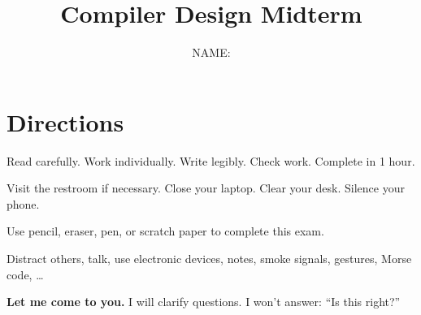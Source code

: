 \documentclass[addpoints]{exam}
\title{Compiler Design Midterm}
\author{NAME: \underline{\hspace{10cm}}}
\date{}
\begin{document}
\maketitle

\section*{Directions}
Read carefully. Work individually. Write legibly. Check work. Complete in 1 hour.
\begin{description}[leftmargin=!,labelwidth=\widthof{\bfseries Beforehand}]
\item[Beforehand] Visit the restroom if necessary. Close your laptop. Clear your desk. Silence your phone.
\item[DO] Use pencil, eraser, pen, or scratch paper to complete this exam.
\item[DO NOT] Distract others, talk, use electronic devices, notes, smoke signals, gestures, Morse code, \ldots
\item[Confused?] \textbf{Let me come to you.} I will clarify questions. I won't answer: ``Is this right?''
\end{description}
\end{document}
